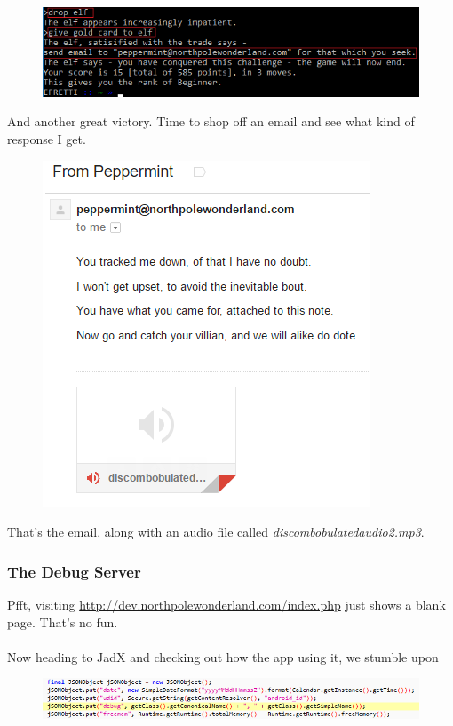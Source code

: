 \documentclass[writeup.tex]{subfiles}
\begin{document}
			\begin{figure}[H]
				\centering
				\includegraphics[scale=1]{"screenshots/pwns/Site 2 - online win"}
			\end{figure}
			
			And another great victory. Time to shop off an email and see what kind of response I get.
			
			\begin{figure}[H]
				\centering
				\includegraphics[scale=1]{"screenshots/pwns/Site 2 - email response"}
			\end{figure}
			
			That's the email, along with an audio file called \textit{discombobulatedaudio2.mp3}.
			
			
		\subsubsection{The Debug Server}
			Pfft, visiting \url{http://dev.northpolewonderland.com/index.php} just shows a blank page. That's no fun.\\
			\\
			Now heading to JadX and checking out how the app using it, we stumble upon
			
			\begin{figure}[H]
				\centering
				\includegraphics[width=\linewidth]{"screenshots/pwns/Site 3 - jadx 1"}
			\end{figure}
			
\end{document}
